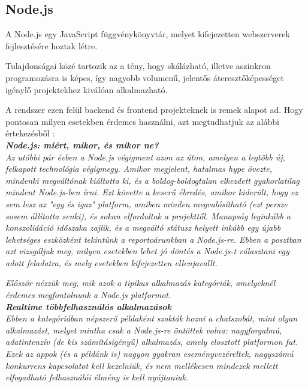 \subsection{Node.js}

A Node.js egy JavaScript függvénykönyvtár, melyet kifejezetten webszerverek fejlesztésére hoztak létre. 

Tulajdonságai közé tartozik az a tény, hogy skálázható, illetve aszinkron programozásra is képes, így nagyobb volumenű, jelentős áteresztőképességet igénylő projektekhez kiválóan alkalmazható.

A rendszer ezen felül backend és frontend projekteknek is remek alapot ad. Hogy pontosan milyen esetekben érdemes használni, azt megtudhatjuk az alábbi értekezésből \cite{nodejscikk}:\\

\noindent\textit{\textbf{\large{Node.js: miért, mikor, és mikor ne?}}}\\

\textit{Az utóbbi pár évben a Node.js végigment azon az úton, amelyen a legtöbb új, felkapott technológia végigmegy. Amikor megjelent, hatalmas hype övezte, mindenki megváltónak kiáltotta ki, és a boldog-boldogtalan elkezdett gyakorlatilag mindent Node.js-ben írni. Ezt követte a keserű ébredés, amikor kiderült, hogy ez sem lesz az "egy és igaz" platform, amiben minden megvalósítható (ezt persze sosem állította senki), és sokan elfordultak a projekttől. Manapság leginkább a konszolidáció időszaka zajlik, és a megváltó státusz helyett inkább egy újabb lehetséges eszközként tekintünk a reportoárunkban a Node.js-re. Ebben a posztban azt vizsgáljuk meg, milyen esetekben lehet jó döntés a Node.js-t választani egy adott feladatra, és mely esetekben kifejezetten ellenjavallt.}

\textit{Először nézzük meg, mik azok a tipikus alkalmazás kategóriák, amelyeknél érdemes megfontolnunk a Node.js platformot.}\\

\noindent\textit{\textbf{Realtime többfelhasználós alkalmazások}}\\

\textit{Ebben a kategóriában népszerű példaként szokták hozni a chatszobát, mint olyan alkalmazást, melyet mintha csak a Node.js-re öntöttek volna: nagyforgalmú, adatintenzív (de kis számításigényű) alkalmazás, amely elosztott platformon fut. Ezek az appok (és a példánk is) nagyon gyakran eseményvezéreltek, nagyszámú konkurrens kapcsolatot kell kezelniük, és nem mellékesen mindezek mellett elfogadható felhasználói élmény is kell nyújtaniuk.}\\

